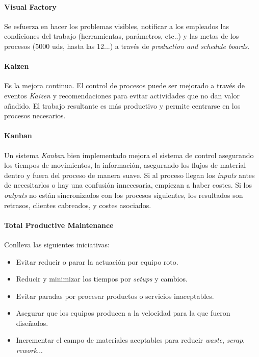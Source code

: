 \documentclass[oneside]{book}
\begin{document}
\paragraph{Visual Factory}

Se esfuerza en hacer los problemas visibles, notificar a los empleados las condiciones del trabajo (herramientas, parámetros, etc..) y las metas de los procesos (5000 uds, hasta las 12...) a través de \textit{production and schedule boards}.

\paragraph{Kaizen}
Es la mejora continua. El control de procesos puede ser mejorado a través de eventos \textit{Kaizen} y recomendaciones para evitar actividades que no dan valor añadido. El trabajo resultante es más productivo y permite centrarse en los procesos necesarios.

\paragraph{Kanban}
Un sistema \textit{Kanban} bien implementado mejora el sistema de control asegurando los tiempos de movimientos, la información, asegurando los flujos de material dentro y fuera del proceso de manera suave. Si al proceso llegan los \textit{inputs} antes de necesitarlos o hay una confusión innecesaria, empiezan a haber costes. Si los \textit{outputs} no están sincronizados con los procesos siguientes, los resultados son retrasos, clientes cabreados, y costes asociados.

\paragraph{Total Productive Maintenance}

Conlleva las siguientes iniciativas: \begin{itemize}
	\item Evitar reducir o parar la actuación por equipo roto.
	\item Reducir y minimizar los tiempos por \textit{setups} y cambios.
	\item Evitar paradas por procesar productos o servicios inaceptables.
	\item Asegurar que los equipos producen a la velocidad para la que fueron diseñados.
	\item Incrementar el campo de materiales aceptables para reducir \textit{waste}, \textit{scrap}, \textit{rework}...
\end{itemize}
\end{document}
